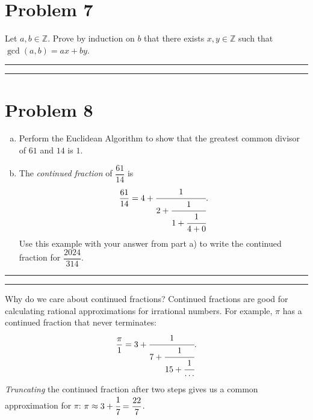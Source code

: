 \documentclass{article}
\theoremstyle{definition}
\newenvironment{solution}{\bigskip\hrule{\hfill}}{\bigskip\hrule{\hfill}} %
\begin{document}

\section*{Problem 7}
Let $a,b\in\mathbb{Z}$. Prove by induction on $b$ that there exists $x,y\in\mathbb{Z}$ such that $\gcd\left(a,b\right)=ax+by$.
\begin{solution}


\end{solution}


\newpage


\section*{Problem 8}

\begin{enumerate}[a)] %
    \item  Perform the Euclidean Algorithm to show that the greatest common divisor of $61$ and $14$ is $1$.
    \item The \emph{continued fraction} of $\dfrac{61}{14}$ is $$\mathrm{\frac{61}{14}}=
4+\cfrac{1}{2+\cfrac{1}{1+\cfrac{1}{4+0}}}.$$ Use this example with your answer from part a) to write the continued fraction for $\dfrac{2024}{314}$.
\end{enumerate}



\begin{solution}


\end{solution}

\vfill

Why do we care about continued fractions? Continued fractions are good for calculating rational approximations for irrational numbers. For example, $\pi$ has a continued fraction that never terminates: $$\mathrm{\dfrac{\pi}{1}}=
3+\cfrac{1}{7+\cfrac{1}{15+\cfrac{1}{\cdots}}}.$$ \emph{Truncating} the continued fraction after two steps gives us a common approximation for $\pi$: $\pi\approx3+\cfrac{1}{7}=\dfrac{22}{7}$.
\end{document}
